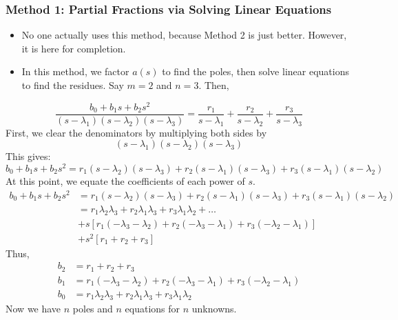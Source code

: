 \documentclass[10pt]{article}
\begin{document}
\subsubsection*{Method 1: Partial Fractions via Solving Linear Equations}
\begin{itemize}
    \item No one actually uses this method, because Method 2 is just better.  However, it is here for completion.
    \item In this method, we factor $a(s)$ to find the poles, then solve linear equations to find the residues.  Say $m = 2$ and $n = 3$.  Then,    
\end{itemize}
\[\frac{b_0 + b_1 s + b_2 s^2}{(s - \lambda_1)(s - \lambda_2)(s - \lambda_3)} = \frac{r_1}{s - \lambda_1} + \frac{r_2}{s - \lambda_2} + \frac{r_3}{s - \lambda_3}\]
First, we clear the denominators by multiplying both sides by 
\[(s - \lambda_1)(s - \lambda_2)(s - \lambda_3)\]
This gives:
\[b_0 + b_1 s + b_2 s^2 = r_1 (s - \lambda_2)(s - \lambda_3) + r_2(s - \lambda_1)(s - \lambda_3) + r_3(s - \lambda_1)(s - \lambda_2)\]
At this point, we equate the coefficients of each power of $s$.
\begin{align*}
    b_0 + b_1 s + b_2 s^2 &= r_1 (s - \lambda_2)(s - \lambda_3) + r_2(s - \lambda_1)(s - \lambda_3) + r_3(s - \lambda_1)(s - \lambda_2)\\
    &= r_1 \lambda_2 \lambda_3 + r_2 \lambda_1 \lambda_3 + r_3 \lambda_1 \lambda_2 + \dots\\
    &+ s[r_1(-\lambda_3 - \lambda_2) + r_2(-\lambda_3 - \lambda_1) + r_3(-\lambda_2 - \lambda_1)]\\
    &+ s^2[r_1 + r_2 + r_3]
\end{align*}
Thus,
\begin{align*}
    b_2 &= r_1 + r_2 + r_3\\
    b_1 &= r_1(-\lambda_3 - \lambda_2) + r_2(-\lambda_3 - \lambda_1) + r_3(-\lambda_2 - \lambda_1)\\
    b_0 &= r_1\lambda_2\lambda_3 + r_2 \lambda_1 \lambda_3 + r_3 \lambda_1 \lambda_2
\end{align*}
Now we have $n$ poles and $n$ equations for $n$ unknowns.
\end{document}
